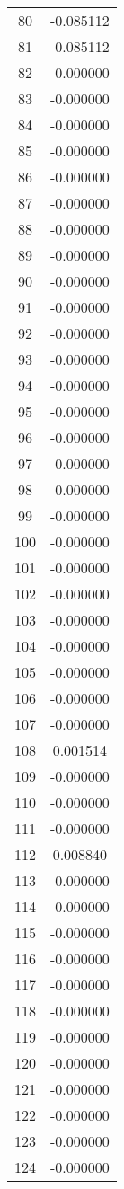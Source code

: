 \documentclass[12pt]{article}
\begin{document}
\begin{longtable}{@{}cc@{}}
80 & -0.085112 \\
81 & -0.085112 \\
82 & -0.000000 \\
83 & -0.000000 \\
84 & -0.000000 \\
85 & -0.000000 \\
86 & -0.000000 \\
87 & -0.000000 \\
88 & -0.000000 \\
89 & -0.000000 \\
90 & -0.000000 \\
91 & -0.000000 \\
92 & -0.000000 \\
93 & -0.000000 \\
94 & -0.000000 \\
95 & -0.000000 \\
96 & -0.000000 \\
97 & -0.000000 \\
98 & -0.000000 \\
99 & -0.000000 \\
100 & -0.000000 \\
101 & -0.000000 \\
102 & -0.000000 \\
103 & -0.000000 \\
104 & -0.000000 \\
105 & -0.000000 \\
106 & -0.000000 \\
107 & -0.000000 \\
108 & 0.001514 \\
109 & -0.000000 \\
110 & -0.000000 \\
111 & -0.000000 \\
112 & 0.008840 \\
113 & -0.000000 \\
114 & -0.000000 \\
115 & -0.000000 \\
116 & -0.000000 \\
117 & -0.000000 \\
118 & -0.000000 \\
119 & -0.000000 \\
120 & -0.000000 \\
121 & -0.000000 \\
122 & -0.000000 \\
123 & -0.000000 \\
124 & -0.000000 \\

\end{longtable}
\end{document}
